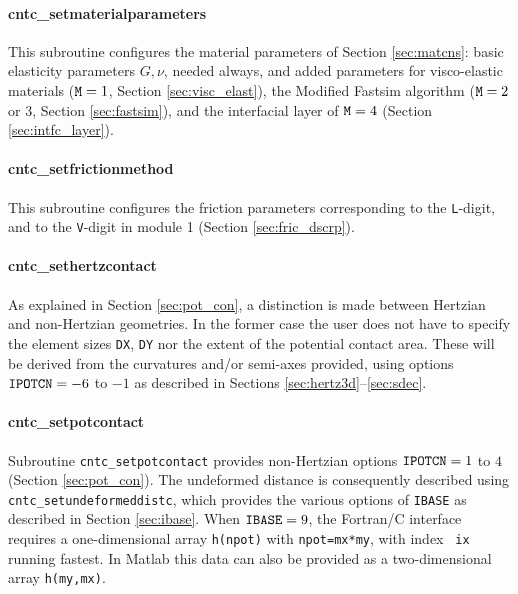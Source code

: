 \documentclass[12pt]{report}
\begin{document}
\paragraph{cntc\_setmaterialparameters}

This subroutine configures the material parameters of Section
\ref{sec:matcns}: basic elasticity parameters $G, \nu$, needed always, and
added parameters for visco-elastic materials (${\tt M}=1$, Section
\ref{sec:visc_elast}), the Modified Fastsim algorithm (${\tt M}=2$ or 3,
Section \ref{sec:fastsim}), and the interfacial layer of ${\tt M}=4$
(Section \ref{sec:intfc_layer}).

\paragraph{cntc\_setfrictionmethod}

This subroutine configures the friction parameters corresponding to the
{\tt L}-digit, and to the {\tt V}-digit in module 1 (Section
\ref{sec:fric_dscrp}).

\paragraph{cntc\_sethertzcontact}

As explained in Section \ref{sec:pot_con}, a distinction is made between
Hertzian and non-Hertzian geometries. In the former case the user does not
have to specify the element sizes {\tt DX}, {\tt DY} nor the extent of the
potential contact area. These will be derived from the curvatures and/or
semi-axes provided, using options ${\tt IPOTCN}=-6$ to $-1$ as described
in Sections \ref{sec:hertz3d}--\ref{sec:sdec}.

\paragraph{cntc\_setpotcontact}

Subroutine {\tt cntc\_setpotcontact} provides non-Hertzian options
${\tt IPOTCN}=1$ to $4$ (Section \ref{sec:pot_con}). The undeformed
distance is consequently described using {\tt cntc\_set\-un\-de\-formed\-distc},
which provides the various options of {\tt IBASE} as described in Section
\ref{sec:ibase}.  When ${\tt IBASE}=9$, the Fortran/C interface requires a
one-dimensional array {\tt h(npot)} with {\tt npot=mx*my}, with index {\tt
ix} running fastest. In Matlab this data can also be provided as a
two-dimensional array {\tt h(my,mx)}.
\end{document}
